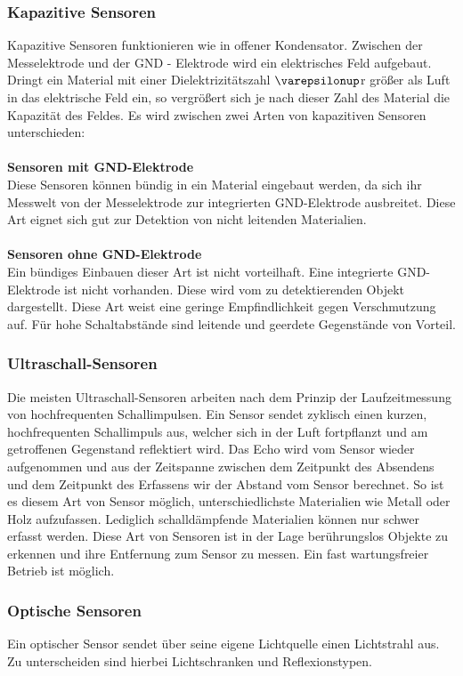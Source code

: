 \subsubsection{Kapazitive Sensoren}
Kapazitive Sensoren funktionieren wie in offener Kondensator. Zwischen der Messelektrode und der GND - Elektrode wird ein elektrisches Feld aufgebaut.
Dringt ein Material mit einer Dielektrizitätszahl $\varepsilonup$r größer als Luft in das elektrische Feld ein, so vergrößert sich je nach dieser Zahl des Material die Kapazität des Feldes.
Es wird zwischen zwei Arten von kapazitiven Sensoren unterschieden: \\\\
\textbf{Sensoren mit GND-Elektrode} \\
Diese Sensoren können bündig in ein Material eingebaut werden, da sich ihr Messwelt von der Messelektrode zur integrierten GND-Elektrode ausbreitet.
Diese Art eignet sich gut zur Detektion von nicht leitenden Materialien. \\\\
\textbf{Sensoren ohne GND-Elektrode} \\
Ein bündiges Einbauen dieser Art ist nicht vorteilhaft. Eine integrierte GND-Elektrode ist nicht vorhanden. Diese wird vom zu detektierenden Objekt dargestellt.
Diese Art weist eine geringe Empfindlichkeit gegen Verschmutzung auf. Für hohe Schaltabstände sind leitende und geerdete Gegenstände von Vorteil.

\subsubsection{Ultraschall-Sensoren}
Die meisten Ultraschall-Sensoren arbeiten nach dem Prinzip der Laufzeitmessung von hochfrequenten Schallimpulsen.
Ein Sensor sendet zyklisch einen kurzen, hochfrequenten Schallimpuls aus, welcher sich in der Luft fortpflanzt und am getroffenen Gegenstand reflektiert wird.
Das Echo wird vom Sensor wieder aufgenommen und aus der Zeitspanne zwischen dem Zeitpunkt des Absendens und dem Zeitpunkt des Erfassens wir der Abstand vom Sensor berechnet.
So ist es diesem Art von Sensor möglich, unterschiedlichste Materialien wie Metall oder Holz aufzufassen. Lediglich schalldämpfende Materialien können nur schwer erfasst werden.
Diese Art von Sensoren ist in der Lage berührungslos Objekte zu erkennen und ihre Entfernung zum Sensor zu messen. Ein fast wartungsfreier Betrieb ist möglich.

\subsubsection{Optische Sensoren}
Ein optischer Sensor sendet über seine eigene Lichtquelle einen Lichtstrahl aus. Zu unterscheiden sind hierbei Lichtschranken und Reflexionstypen.

